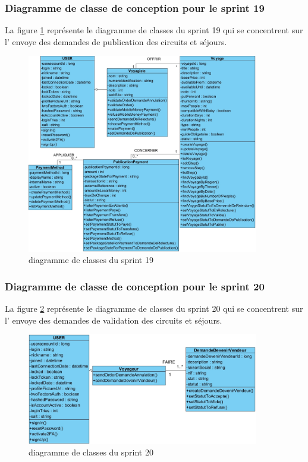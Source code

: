 \documentclass[12pt]{report}
\begin{document}
			\subsubsection{Diagramme de classe de conception pour le sprint 19}
				
			\hspace{15pt} La figure \ref{fig:sprint19} représente le diagramme de classes du sprint 19 qui se concentrent sur l' envoye des demandes de publication des circuits et séjours.


			\begin{figure}[h]
				\centering
				\includegraphics[width=0.9\textwidth]{sprint19.jpg}
				\caption{diagramme de classes du sprint 19}
				\label{fig:sprint19}
			\end{figure}
			\FloatBarrier

			\subsubsection{Diagramme de classe de conception pour le sprint 20}
				
			\hspace{15pt} La figure \ref{fig:sprint20} représente le diagramme de classes du sprint 20 qui se concentrent sur l' envoye des demandes de validation des circuits et séjours.


			\begin{figure}[h]
				\centering
				\includegraphics[width=0.9\textwidth]{sprint20.jpg}
				\caption{diagramme de classes du sprint 20}
				\label{fig:sprint20}
			\end{figure}
			\FloatBarrier
\end{document}
